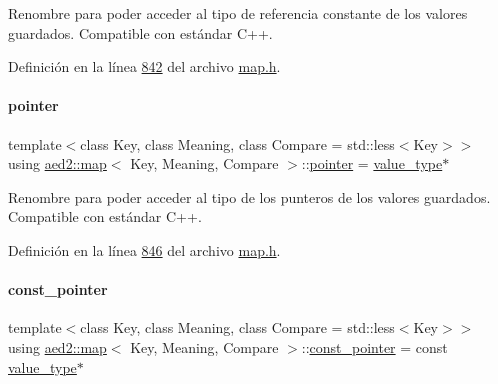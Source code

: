 Renombre para poder acceder al tipo de referencia constante de los valores guardados. Compatible con estándar C++. 



Definición en la línea \hyperlink{map_8h_source_l00842}{842} del archivo \hyperlink{map_8h_source}{map.\+h}.

\mbox{\label{classaed2_1_1map_a7394e98a23b86bc008ad73326b273fd5_a7394e98a23b86bc008ad73326b273fd5}} 
\paragraph{\texorpdfstring{pointer}{pointer}}
{\footnotesize\ttfamily template$<$class Key, class Meaning, class Compare = std\+::less$<$\+Key$>$$>$ \\
using \hyperlink{classaed2_1_1map}{aed2\+::map}$<$ Key, Meaning, Compare $>$\+::\hyperlink{classaed2_1_1map_a7394e98a23b86bc008ad73326b273fd5_a7394e98a23b86bc008ad73326b273fd5}{pointer} =  \hyperlink{classaed2_1_1map_a719db98e0ff9a837610f76be33264680_a719db98e0ff9a837610f76be33264680}{value\+\_\+type}$\ast$}



Renombre para poder acceder al tipo de los punteros de los valores guardados. Compatible con estándar C++. 



Definición en la línea \hyperlink{map_8h_source_l00846}{846} del archivo \hyperlink{map_8h_source}{map.\+h}.

\mbox{\label{classaed2_1_1map_a1366fc3e227a49777cb748fc6d4e022b_a1366fc3e227a49777cb748fc6d4e022b}} 
\paragraph{\texorpdfstring{const\+\_\+pointer}{const\_pointer}}
{\footnotesize\ttfamily template$<$class Key, class Meaning, class Compare = std\+::less$<$\+Key$>$$>$ \\
using \hyperlink{classaed2_1_1map}{aed2\+::map}$<$ Key, Meaning, Compare $>$\+::\hyperlink{classaed2_1_1map_a1366fc3e227a49777cb748fc6d4e022b_a1366fc3e227a49777cb748fc6d4e022b}{const\+\_\+pointer} =  const \hyperlink{classaed2_1_1map_a719db98e0ff9a837610f76be33264680_a719db98e0ff9a837610f76be33264680}{value\+\_\+type}$\ast$}



